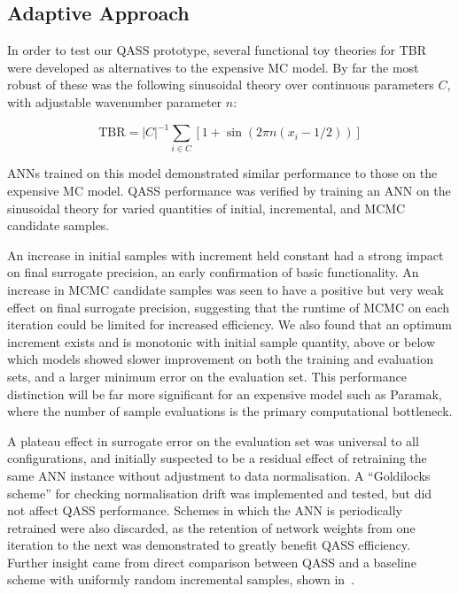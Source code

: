 \subsection{Adaptive Approach}\label{sec:adaptiveres}


In order to test our QASS prototype, several functional toy theories for TBR were developed as alternatives to the expensive MC model. By far the most robust of these was the following sinusoidal theory over continuous parameters $C$, with adjustable wavenumber parameter $n$:

\begin{equation}
	\text{TBR} = |C|^{-1}\sum_{i \in C} \left[1 + \sin(2\pi n (x_i - 1/2)) \right]
\end{equation}

ANNs trained on this model demonstrated similar performance to those on the expensive
MC model. QASS performance was verified by training an ANN on
the sinusoidal theory for varied quantities of initial, incremental, and MCMC
candidate samples.

An increase in initial samples with increment held constant had a strong impact
on final surrogate precision, an early confirmation of basic functionality. An
increase in MCMC candidate samples was seen to have a positive but very weak
effect on final surrogate precision, suggesting that the runtime of MCMC on each
iteration could be limited for increased efficiency. We also found that an optimum increment exists and is monotonic with initial sample quantity, above or below which models showed slower improvement on both the training and evaluation sets, and a larger minimum error on the
evaluation set. This performance distinction will be far more
significant for an expensive model such as Paramak, where the number of sample
evaluations is the primary computational bottleneck.

A plateau effect in surrogate error on the evaluation set was universal to all configurations, and initially suspected to be a residual
effect of retraining the same ANN instance without adjustment to data
normalisation. A ``Goldilocks scheme'' for checking normalisation drift was
implemented and tested, but did not affect QASS performance. Schemes in which
the ANN is periodically retrained were also discarded, as the retention of
network weights from one iteration to the next was demonstrated to greatly
benefit QASS efficiency. Further insight came from direct comparison between
QASS and a baseline scheme with uniformly random incremental samples, shown
in~.

